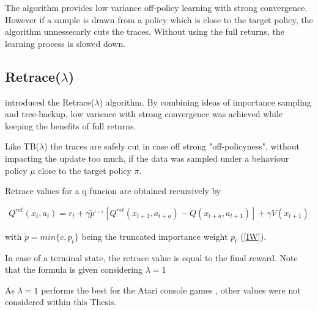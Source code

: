 The algorithm provides low variance off-policy learning with strong convergence.
However if a sample is drawn from a policy which is close to the target policy, the algorithm unnessecarly cuts the traces. Without using the full returns, the learning process is slowed down.
\pagebreak
\subsection{Retrace($\lambda$)}

\citet{Munos16} introduced the Retrace($\lambda$) algorithm. By combining ideas of importance sampling and tree-backup, low varience with strong convergence was achieved while keeping the benefits of full returns.

Like TB($\lambda$) the traces are safely cut in case off strong "off-policyness", without impacting the update too much, if the data was sampled under a behaviour policy $\mu$ close to the target policy $\pi$.

Retrace values for a q funcion are obtained recursively by

\begin{align}
{
Q^{ret}(x_t,a_t)=r_t+\gamma \tilde{p}^_{t+1}[Q^{ret}(x_{t+1},a_{t+a} ) -  Q(x_{t+a},a_{t+1})] + \gamma V(x_{t+1})
}
\label{qretrace}
\end{align}

with $\tilde{p} = min\{c,p_t\}$ being the truncated importance weight $p_t$ (\ref{IW}).

In case of a terminal state, the retrace value is equal to the final reward.
Note that the formula is given considering $\lambda = 1$

As $\lambda = 1$ performs the best for the Atari console games \citep{Munos16}, other values were not considered within this Thesis.

\pagebreak

